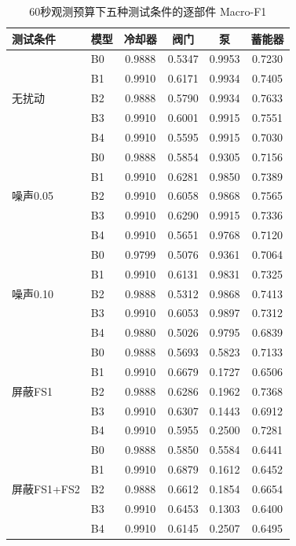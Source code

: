 \documentclass[12pt, a4paper]{ctexart}
\begin{document}
\begin{table}[H]
    \centering
    \caption{60秒观测预算下五种测试条件的逐部件 Macro-F1}
    \label{tab:robust_percomp}
    \small
    \begin{tabular}{llcccc}
        \toprule
        \textbf{测试条件} & \textbf{模型} & \textbf{冷却器} & \textbf{阀门} & \textbf{泵} & \textbf{蓄能器} \\
        \midrule
        \multirow{5}{*}{无扰动}
            & B0 & 0.9888 & 0.5347 & 0.9953 & 0.7230 \\
            & B1 & 0.9910 & 0.6171 & 0.9934 & 0.7405 \\
            & B2 & 0.9888 & 0.5790 & 0.9934 & 0.7633 \\
            & B3 & 0.9910 & 0.6001 & 0.9915 & 0.7551 \\
            & B4 & 0.9910 & 0.5595 & 0.9915 & 0.7030 \\
        \midrule
        \multirow{5}{*}{噪声0.05}
            & B0 & 0.9888 & 0.5854 & 0.9305 & 0.7156 \\
            & B1 & 0.9910 & 0.6281 & 0.9850 & 0.7389 \\
            & B2 & 0.9910 & 0.6058 & 0.9868 & 0.7565 \\
            & B3 & 0.9910 & 0.6290 & 0.9915 & 0.7336 \\
            & B4 & 0.9910 & 0.5651 & 0.9768 & 0.7120 \\
        \midrule
        \multirow{5}{*}{噪声0.10}
            & B0 & 0.9799 & 0.5076 & 0.9361 & 0.7064 \\
            & B1 & 0.9910 & 0.6131 & 0.9831 & 0.7325 \\
            & B2 & 0.9888 & 0.5312 & 0.9868 & 0.7413 \\
            & B3 & 0.9910 & 0.6053 & 0.9897 & 0.7312 \\
            & B4 & 0.9880 & 0.5026 & 0.9795 & 0.6839 \\
        \midrule
        \multirow{5}{*}{屏蔽FS1}
            & B0 & 0.9888 & 0.5693 & 0.5823 & 0.7133 \\
            & B1 & 0.9910 & 0.6679 & 0.1727 & 0.6506 \\
            & B2 & 0.9888 & 0.6286 & 0.1962 & 0.7368 \\
            & B3 & 0.9910 & 0.6307 & 0.1443 & 0.6912 \\
            & B4 & 0.9910 & 0.5955 & 0.2500 & 0.7281 \\
        \midrule
        \multirow{5}{*}{屏蔽FS1+FS2}
            & B0 & 0.9888 & 0.5850 & 0.5584 & 0.6441 \\
            & B1 & 0.9910 & 0.6879 & 0.1612 & 0.6452 \\
            & B2 & 0.9888 & 0.6612 & 0.1854 & 0.6654 \\
            & B3 & 0.9910 & 0.6453 & 0.1303 & 0.6400 \\
            & B4 & 0.9910 & 0.6145 & 0.2507 & 0.6495 \\
        \bottomrule
    \end{tabular}
\end{table}
\end{document}
